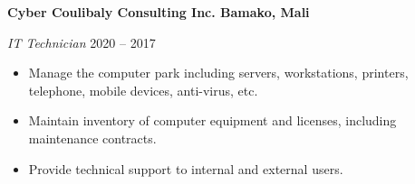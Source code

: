 \textbf{Cyber Coulibaly Consulting Inc. \hfill  Bamako, Mali} \par
\textit{IT Technician} \hfill 2020 -- 2017 \par
\begin{itemize}
	\item Manage the computer park including servers, workstations, printers, telephone, mobile devices, anti-virus, etc.
	\item Maintain inventory of computer equipment and licenses, including maintenance contracts.
	\item Provide technical support to internal and external users.
\end{itemize} \par